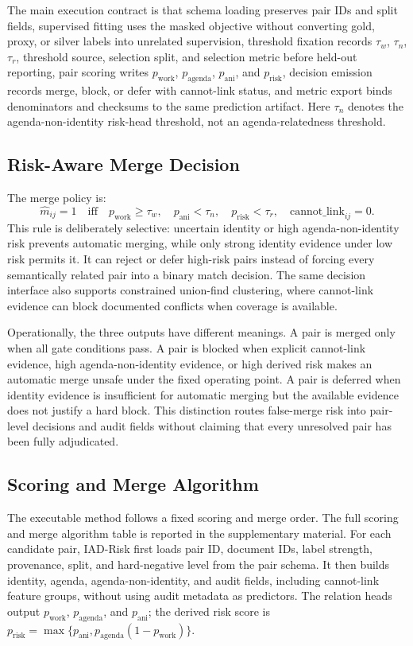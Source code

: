 \documentclass[preprint,12pt]{elsarticle}
\begin{document}
The main execution contract is that schema loading preserves pair IDs and split fields, supervised fitting uses the masked objective without converting gold, proxy, or silver labels into unrelated supervision, threshold fixation records $\tau_w$, $\tau_n$, $\tau_r$, threshold source, selection split, and selection metric before held-out reporting, pair scoring writes $p_{\mathrm{work}}$, $p_{\mathrm{agenda}}$, $p_{\mathrm{ani}}$, and $p_{\mathrm{risk}}$, decision emission records merge, block, or defer with cannot-link status, and metric export binds denominators and checksums to the same prediction artifact. Here $\tau_n$ denotes the agenda-non-identity risk-head threshold, not an agenda-relatedness threshold.

\subsection{Risk-Aware Merge Decision}

The merge policy is:
\[
\hat{m}_{ij}=1 \quad \mathrm{iff}\quad
p_{\mathrm{work}}\geq \tau_w,\quad
p_{\mathrm{ani}}<\tau_n,\quad
p_{\mathrm{risk}}<\tau_r,\quad
\mathrm{cannot\_link}_{ij}=0.
\]
This rule is deliberately selective: uncertain identity or high agenda-non-identity risk prevents automatic merging, while only strong identity evidence under low risk permits it. It can reject or defer high-risk pairs instead of forcing every semantically related pair into a binary match decision. The same decision interface also supports constrained union-find clustering, where cannot-link evidence can block documented conflicts when coverage is available.

Operationally, the three outputs have different meanings. A pair is merged only when all gate conditions pass. A pair is blocked when explicit cannot-link evidence, high agenda-non-identity evidence, or high derived risk makes an automatic merge unsafe under the fixed operating point. A pair is deferred when identity evidence is insufficient for automatic merging but the available evidence does not justify a hard block. This distinction routes false-merge risk into pair-level decisions and audit fields without claiming that every unresolved pair has been fully adjudicated.

\subsection{Scoring and Merge Algorithm}

The executable method follows a fixed scoring and merge order. The full scoring and merge algorithm table is reported in the supplementary material. For each candidate pair, IAD-Risk first loads pair ID, document IDs, label strength, provenance, split, and hard-negative level from the pair schema. It then builds identity, agenda, agenda-non-identity, and audit fields, including cannot-link feature groups, without using audit metadata as predictors. The relation heads output $p_{\mathrm{work}}$, $p_{\mathrm{agenda}}$, and $p_{\mathrm{ani}}$; the derived risk score is $p_{\mathrm{risk}}=\max\{p_{\mathrm{ani}},p_{\mathrm{agenda}}(1-p_{\mathrm{work}})\}$.
\end{document}
